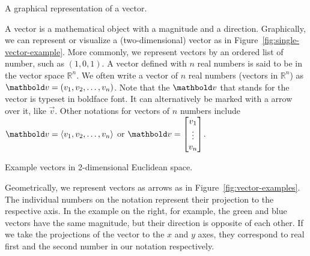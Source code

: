 \begin{marginfigure}[5ex]
  \caption{\label{fig:single-vector-example}A graphical representation of a vector.}
\end{marginfigure}
A vector is a mathematical object with a magnitude and a direction.
Graphically, we can represent or visualize a (two-dimensional) vector
as in Figure~\ref{fig:single-vector-example}.
More commonly,
we represent vectors by an ordered list of number,
such as $(1, 0, 1)$.
A vector defined with $n$ real numbers is said to be in the vector space $\mathbb{R}^{n}$.
We often write a vector of $n$ real numbers (vectors in $\mathbb{R}^{n}$) as
$\vect{v} = (v_{1}, v_{2}, \ldots, v_{n})$.
Note that the $\vect{v}$ that stands for the vector is typeset in boldface font.
It can alternatively be marked with a arrow over it, like $\vec{v}$.
Other notations for vectors of $n$ numbers include
$\vect{v} = \langle v_{1}, v_{2}, \ldots, v_{n}\rangle$ or
$\vect{v} = \begin{bmatrix} v_{1}\\ \vdots\\ v_{n}\\ \end{bmatrix}$.

\begin{marginfigure}[5ex]
  \caption{\label{fig:vector-examples}Example vectors in 2-dimensional Euclidean space.}
\end{marginfigure}
Geometrically, we represent vectors as arrows as in Figure~\ref{fig:vector-examples}.
The individual numbers on the notation represent their projection to the respective axis.
In the example on the right,
for example,
the green and blue vectors have the same magnitude,
but their direction is opposite of each other.
If we take the projections of the vector to the $x$ and $y$ axes,
they correspond to real first and the second number in our notation respectively.

